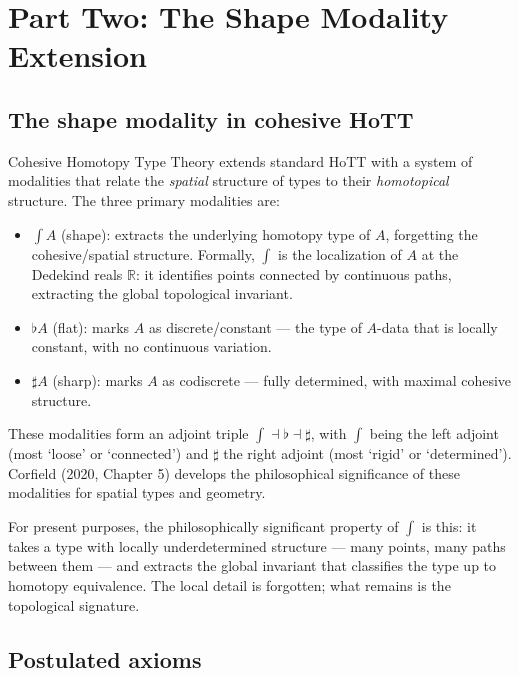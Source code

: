 \documentclass[12pt]{article}
\theoremstyle{definition}
\theoremstyle{remark}
\newcommand{\shapemod}{\int}                    %
\newcommand{\flatmod}{{\flat}}                  %
\newcommand{\sharpmod}{{\sharp}}                %
\begin{document}
\section{Part Two: The Shape Modality Extension}

\subsection{The shape modality in cohesive HoTT}

Cohesive Homotopy Type Theory \cite{shulman2018} extends standard HoTT with a system of modalities that relate the \emph{spatial} structure of types to their \emph{homotopical} structure. The three primary modalities are:

\begin{itemize}
\item $\shapemod A$ (shape): extracts the underlying homotopy type of $A$, forgetting the cohesive/spatial structure. Formally, $\shapemod$ is the localization of $A$ at the Dedekind reals $\mathbb{R}$: it identifies points connected by continuous paths, extracting the global topological invariant.
\item $\flatmod A$ (flat): marks $A$ as discrete/constant --- the type of $A$-data that is locally constant, with no continuous variation.
\item $\sharpmod A$ (sharp): marks $A$ as codiscrete --- fully determined, with maximal cohesive structure.
\end{itemize}

These modalities form an adjoint triple $\shapemod \dashv \flatmod \dashv \sharpmod$, with $\shapemod$ being the left adjoint (most `loose' or `connected') and $\sharpmod$ the right adjoint (most `rigid' or `determined'). Corfield (2020, Chapter 5) develops the philosophical significance of these modalities for spatial types and geometry.

For present purposes, the philosophically significant property of $\shapemod$ is this: it takes a type with locally underdetermined structure --- many points, many paths between them --- and extracts the global invariant that classifies the type up to homotopy equivalence. The local detail is forgotten; what remains is the topological signature.

\subsection{Postulated axioms}
\end{document}
